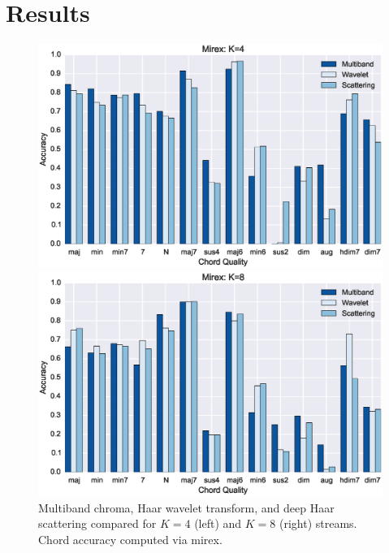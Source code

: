 \documentclass{article}
\begin{document}
	
\section{Results}\label{sec:results}

\begin{figure}[h!]
\centering
\begin{minipage}{\columnwidth}
	\centering
	\includegraphics[width=1.05\columnwidth]{figs/mirex4.eps}
\end{minipage}
\begin{minipage}{\columnwidth}
	\centering
	\includegraphics[width=1.05\columnwidth]{figs/mirex8.eps}
\end{minipage}
\caption{Multiband chroma, Haar wavelet transform, and deep Haar scattering compared for $K=4$ (left) and $K=8$ (right) streams. Chord accuracy computed via mirex.}
\label{fig:mirex}
\end{figure}
\end{document}
